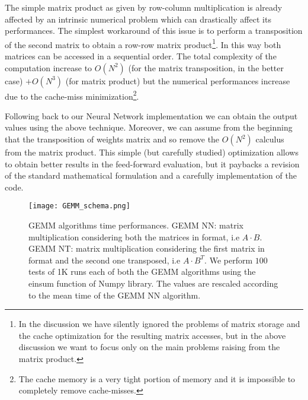 \documentclass{standalone}
\begin{document}
The simple matrix product as given by row-column multiplication is already affected by an intrinsic numerical problem which can drastically affect its performances.
The simplest workaround of this issue is to perform a transposition of the second matrix to obtain a row-row matrix product\footnote{
  In the discussion we have silently ignored the problems of matrix storage and the cache optimization for the resulting matrix accesses, but in the above discussion we want to focus only on the main problems raising from the matrix product.
}.
In this way both matrices can be accessed in a sequential order.
The total complexity of the computation increase to $O(N^2)$ (for the matrix transposition, in the better case) $+ O(N^3)$ (for matrix product) but the numerical performances increase due to the cache-miss minimization\footnote{
  The cache memory is a very tight portion of memory and it is impossible to completely remove cache-misses.
}.

Following back to our Neural Network implementation we can obtain the output values using the above technique.
Moreover, we can assume from the beginning that the transposition of weights matrix and so remove the $O(N^2)$ calculus from the matrix product.
This simple (but carefully studied) optimization allows to obtain better results in the feed-forward evaluation, but it paybacks a revision of the standard mathematical formulation and a carefully implementation of the code.

\begin{figure}[htbp]
\texttt{[image: GEMM\_schema.png]}
\quad
\centering
\def\svgwidth{0.45\textwidth}

\caption{GEMM algorithms time performances.
\textsf{GEMM NN}: matrix multiplication considering both the matrices in  format, i.e $A\cdot B$.
\textsf{GEMM NT}: matrix multiplication considering the first matrix in  format and the second one transposed, i.e $A\cdot B^T$.
We perform $100$ tests of 1K runs each of both the \textsf{GEMM} algorithms using the \textsf{einsum} function of \textsf{Numpy} library.
The values are rescaled according to the mean time of the \textsf{GEMM NN} algorithm.
}
\label{fig:gemm}
\end{figure}
\end{document}
